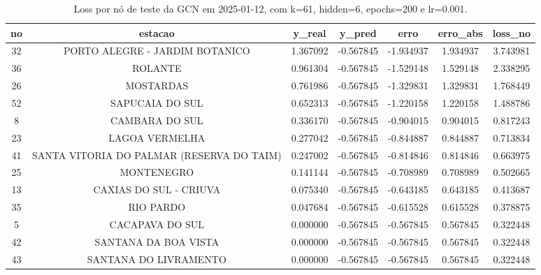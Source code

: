 \begin{table}[h]
\centering
\caption{Loss por nó de teste da GCN em 2025-01-12, com k=61, hidden=6, epochs=200 e lr=0.001.}
\label{tab:gcn_loss_nodes_k61_hidden6}
\begin{tabular}{ccccccc}
\toprule
no & estacao & y\_real & y\_pred & erro & erro\_abs & loss\_no \\
\midrule
32 & PORTO ALEGRE - JARDIM BOTANICO & 1.367092 & -0.567845 & -1.934937 & 1.934937 & 3.743981 \\
36 & ROLANTE & 0.961304 & -0.567845 & -1.529148 & 1.529148 & 2.338295 \\
26 & MOSTARDAS & 0.761986 & -0.567845 & -1.329831 & 1.329831 & 1.768449 \\
52 & SAPUCAIA DO SUL & 0.652313 & -0.567845 & -1.220158 & 1.220158 & 1.488786 \\
8 & CAMBARA DO SUL & 0.336170 & -0.567845 & -0.904015 & 0.904015 & 0.817243 \\
23 & LAGOA VERMELHA & 0.277042 & -0.567845 & -0.844887 & 0.844887 & 0.713834 \\
41 & SANTA VITORIA DO PALMAR (RESERVA DO TAIM) & 0.247002 & -0.567845 & -0.814846 & 0.814846 & 0.663975 \\
25 & MONTENEGRO & 0.141144 & -0.567845 & -0.708989 & 0.708989 & 0.502665 \\
13 & CAXIAS DO SUL - CRIUVA & 0.075340 & -0.567845 & -0.643185 & 0.643185 & 0.413687 \\
35 & RIO PARDO & 0.047684 & -0.567845 & -0.615528 & 0.615528 & 0.378875 \\
5 & CACAPAVA DO SUL & 0.000000 & -0.567845 & -0.567845 & 0.567845 & 0.322448 \\
42 & SANTANA DA BOA VISTA & 0.000000 & -0.567845 & -0.567845 & 0.567845 & 0.322448 \\
43 & SANTANA DO LIVRAMENTO & 0.000000 & -0.567845 & -0.567845 & 0.567845 & 0.322448 \\
\bottomrule
\end{tabular}
\end{table}
